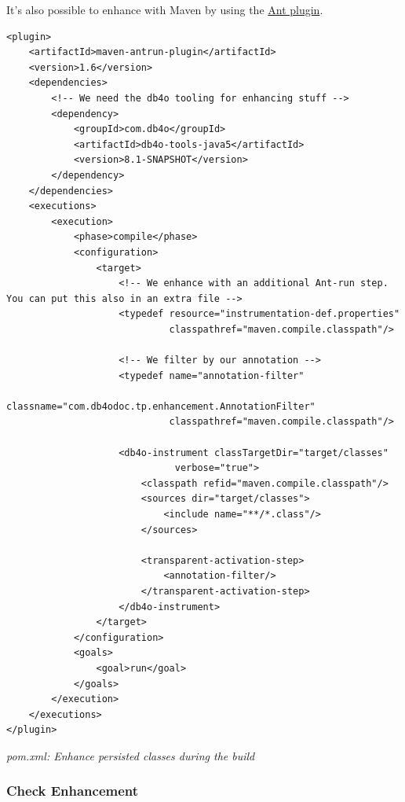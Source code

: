 It's also possible to enhance with Maven by using the \href{http://maven.apache.org/plugins/maven-antrun-plugin/}{Ant plugin}.

\begin{lstlisting}
<plugin>
    <artifactId>maven-antrun-plugin</artifactId>
    <version>1.6</version>
    <dependencies>
        <!-- We need the db4o tooling for enhancing stuff -->
        <dependency>
            <groupId>com.db4o</groupId>
            <artifactId>db4o-tools-java5</artifactId>
            <version>8.1-SNAPSHOT</version>
        </dependency>
    </dependencies>
    <executions>
        <execution>
            <phase>compile</phase>
            <configuration>
                <target>
                    <!-- We enhance with an additional Ant-run step. You can put this also in an extra file -->
                    <typedef resource="instrumentation-def.properties"
                             classpathref="maven.compile.classpath"/>

                    <!-- We filter by our annotation -->
                    <typedef name="annotation-filter"
                             classname="com.db4odoc.tp.enhancement.AnnotationFilter"
                             classpathref="maven.compile.classpath"/>

                    <db4o-instrument classTargetDir="target/classes"
                              verbose="true">
                        <classpath refid="maven.compile.classpath"/>
                        <sources dir="target/classes">
                            <include name="**/*.class"/>
                        </sources>

                        <transparent-activation-step>
                            <annotation-filter/>
                        </transparent-activation-step>
                    </db4o-instrument>
                </target>
            </configuration>
            <goals>
                <goal>run</goal>
            </goals>
        </execution>
    </executions>
</plugin>
\end{lstlisting}

{\small\itshape pom.xml: Enhance persisted classes during the build\par}
\medskip

\subsubsection{Check Enhancement}
\label{ref:basics-transparentpersistence-ta-enhanced-example:check}

